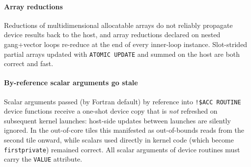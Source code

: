 \documentclass[twocolumn]{aastex701}
\begin{document}
\paragraph{Array reductions}
Reductions of multidimensional allocatable arrays do not reliably
propagate device results back to the host, and array reductions declared
on nested gang+vector loops re-reduce at the end of every inner-loop
instance.  Slot-strided partial arrays updated with \texttt{ATOMIC
UPDATE} and summed on the host are both correct and fast.

\paragraph{By-reference scalar arguments go stale}
Scalar arguments passed (by Fortran default) by reference into
\texttt{!\$ACC ROUTINE} device functions receive a one-shot device copy
that is \emph{not} refreshed on subsequent kernel launches: host-side
updates between launches are silently ignored.  In the out-of-core tiles
this manifested as out-of-bounds reads from the second tile onward, while
scalars used directly in kernel code (which become \texttt{firstprivate})
remained correct.  All scalar arguments of device routines must carry the
\texttt{VALUE} attribute.



\end{document}
